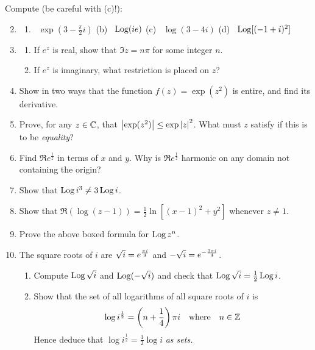 \begin{exercises}
	\exstart Compute (be careful with (c)!):
	\begin{enumerate}\setcounter{enumi}{1}
	  \item[]\begin{enumerate}
	  	\item\ $\exp(3-\frac\pi 2 i)$\qquad
	  	(b) \ $\operatorname{Log}(ie)$\qquad
	  	(c) \ $\log(3-4i)$\qquad
	  	(d) \ $\operatorname{Log}[(-1+i)^2]$
	  \end{enumerate}
  
	  \item\begin{enumerate}
	    \item If $e^z$ is real, show that $\Im z=n\pi$ for some integer $n$.
	    \item If $e^z$ is imaginary, what restriction is placed on $z$?
	  \end{enumerate}
	  
	  \item Show in two ways that the function $f(z)=\exp(z^2)$ is entire, and find its derivative.
	  
	  \item Prove, for any $z\in\mathbb{C}$, that $\left| \exp(z^2)\right|\le \exp\left| z\right|^2$. What must $z$ satisfy if this is to be \emph{equality}?
	  
	  \item Find $\Re e^{\frac 1z}$ in terms of $x$ and $y$. Why is $\Re e^{\frac 1z}$ harmonic on any domain not containing the origin?
	  
	  \item Show that $\operatorname{Log} i^3\neq 3\operatorname{Log} i$.
	  
	  \item Show that $\Re(\log (z-1))=\frac 12\ln[(x-1)^2+y^2]$ whenever $z\neq 1$.
	  
	  \item Prove the above boxed formula for $\operatorname{Log} z^n$.
	  
	  \item The square roots of $i$ are $\sqrt i=e^{\frac{\pi i}{4}}$ and $-\sqrt i=e^{-\frac{3\pi i}{4}}$.
	  \begin{enumerate}
	    \item Compute $\operatorname{Log}\sqrt i$ and $\operatorname{Log}(-\sqrt i)$ and check that $\operatorname{Log}\sqrt i=\frac 12\operatorname{Log} i$.
	    \item Show that the set of all logarithms of all square roots of $i$ is
	    \[
	    	\log i^{\frac 12}=\left(n+\frac 14\right)\pi i\quad\text{where}\quad n\in\mathbb{Z}
	    \]
	    Hence deduce that $\log i^{\frac 12}=\frac 12\log i$ \emph{as sets.}
		\end{enumerate}
	\end{enumerate}
\end{exercises}

